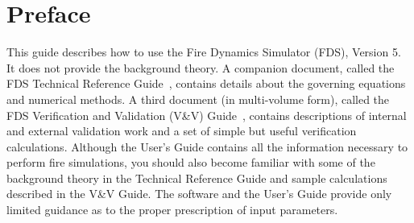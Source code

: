 \documentclass[11pt]{book}
\begin{document}
\newpage

\begin{minipage}[t][9in][s]{6.25in}


\vspace{3in}

\large
{}

\vfill

\end{minipage}

\clearpage

\frontmatter

\pagestyle{plain}


\chapter{Preface}

This guide describes how to use the Fire Dynamics Simulator (FDS), Version 5.
It does not provide the background theory. A companion document, called the FDS
Technical Reference Guide~\cite{FDS_Tech_Guide_5}, contains details about the governing
equations and numerical methods.
A third document (in multi-volume form), called the FDS Verification and Validation
(V\&V) Guide~\cite{FDS_VV_Guide_5}, contains descriptions of internal and external
validation work and a set of simple but useful verification calculations. Although the User's
Guide contains all the information necessary to perform
fire simulations, you should also become familiar with some of the background theory in the
Technical Reference Guide and sample calculations described in the V\&V Guide.
The software and the User's Guide provide only limited guidance as to the proper prescription
of input parameters.
\end{document}
